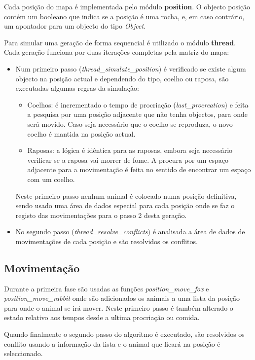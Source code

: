 \documentclass[12pt]{article}
\begin{document}
Cada posição do mapa é implementada pelo módulo \textbf{position}. O objecto posição contém
um booleano que indica se a posição é uma rocha, e, em caso contrário, um apontador para um objecto do tipo \textit{Object}.

Para simular uma geração de forma sequencial é utilizado o módulo \textbf{thread}. Cada geração
funciona por duas iterações completas pela matriz do mapa:

\begin{itemize}
  \item Num primeiro passo (\textit{thread\_simulate\_position}) é verificado se existe algum objecto
  na posição actual e dependendo do tipo, coelho ou raposa, são executadas algumas regras da simulação:
    \begin{itemize}
      \item Coelhos: é incrementado o tempo de procriação (\textit{last\_procreation}) e feita a pesquisa por uma posição
        adjacente que não tenha objectos, para onde será movido.
        Caso seja necessário que o coelho se reproduza, o novo coelho é mantida na posição
        actual.
      \item Raposas: a lógica é idêntica para as raposas, embora seja necessário verificar se a raposa vai morrer de fome.
       A procura por um espaço adjacente para a movimentação é feita no sentido de encontrar um espaço com um coelho.
    \end{itemize}
    Neste primeiro passo nenhum animal é colocado numa posição definitiva, sendo usado uma área de dados
    especial para cada posição onde se faz o registo das movimentações para o passo 2 desta geração.
  \item No segundo passo (\textit{thread\_resolve\_conflicts}) é analisada a área de dados de movimentações de cada posição e são resolvidos os conflitos.
\end{itemize}

\subsection{Movimentação}

Durante a primeira fase são usadas as funções \textit{position\_move\_fox} e \textit{position\_move\_rabbit}
onde são adicionados os animais a uma lista da posição para onde o animal se irá mover.
Neste primeiro passo é também alterado o estado relativo aos tempos desde a ultima procriação ou comida.

Quando finalmente o segundo passo do algoritmo é executado, são resolvidos os conflito usando a informação
da lista e o animal que ficará na posição é seleccionado.
\end{document}
